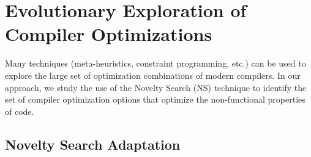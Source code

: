 \begin{table}
{\begin{tabular}[c]{|c|p{3cm}||c|p{3cm}|}
		\end{tabular}
	}
\end{table}
\fi

\section{Evolutionary Exploration of Compiler Optimizations }


Many techniques (meta-heuristics, constraint programming, etc.) can be used to explore the large set of optimization combinations of modern compilers. 
In our approach, we study the use of the Novelty Search (NS) technique to identify the set of compiler optimization options that optimize the non-functional properties of code.

\subsection{Novelty Search Adaptation}

